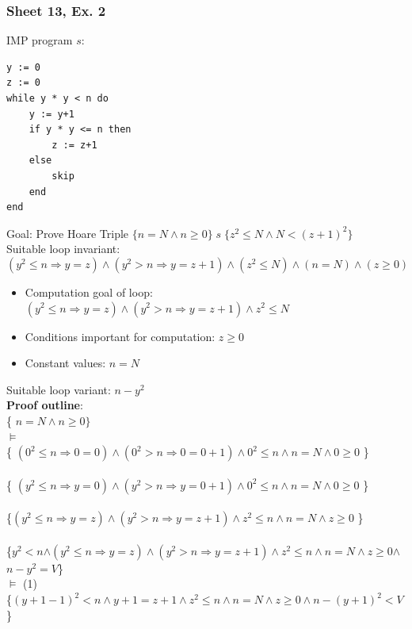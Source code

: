 \documentclass{article}
\begin{document}
\subsubsection{Sheet 13, Ex. 2}
IMP program $s$:
\begin{verbatim}
y := 0
z := 0
while y * y < n do
    y := y+1
    if y * y <= n then
        z := z+1
    else
        skip
    end
end
\end{verbatim}
Goal: Prove
Hoare Triple $\{n=N \land n \geq 0\} \; s \; \{ z^2 \leq N \land N < (z+1)^2\}$ \smallskip \\
Suitable loop invariant: 
$$(y^2 \leq n \Rightarrow y = z) \land (y^2 > n \Rightarrow y = z + 1) \land (z^2 \leq N) \land (n=N) \land (z \geq 0)$$ 
\begin{itemize}
    \item Computation goal of loop: $(y^2 \leq n \Rightarrow y = z) \land (y^2 > n \Rightarrow y = z + 1) \land z^2\leq N$
    \item Conditions important for computation: $z \geq 0$
    \item Constant values: $n=N$
\end{itemize}
Suitable loop variant: $n-y^2$ 
\smallskip \\
\textbf{Proof outline}: \\
\{ $n=N \land n \geq 0\}$ \\
$\vDash$ \\
\{ $(0^2 \leq n \Rightarrow 0 = 0) \land (0^2 > n \Rightarrow 0 = 0 + 1) \land 0^2 \leq n \land n=N \land 0 \geq 0$ \} 
\\
 \\
\{ $(y^2 \leq n \Rightarrow y = 0) \land (y^2 > n \Rightarrow y = 0 + 1) \land 0^2 \leq n \land n=N \land 0 \geq 0$ \}
\\
 \\
\{\colorbox{blue!10}{$(y^2 \leq n \Rightarrow y = z) \land (y^2 > n \Rightarrow y = z + 1) \land z^2 \leq n \land n=N \land z \geq 0$} \}
\\
 \\
\{\colorbox{magenta!10}{$y^2 < n$}$\land$\colorbox{blue!10}{$(y^2 \leq n \Rightarrow y = z) \land (y^2 > n \Rightarrow y = z + 1) \land z^2 \leq n \land n=N \land z \geq 0$}$\land$\colorbox{teal!10}{$n-y^2=V$}\} \\
$\vDash$ (1) \\
\{$(y+1-1)^2<n \land y+1 = z+1\land z^2 \leq n \land n=N \land z\geq 0\land$\colorbox{teal!10}{$n-(y+1)^2<V$}\} 
\end{document}
